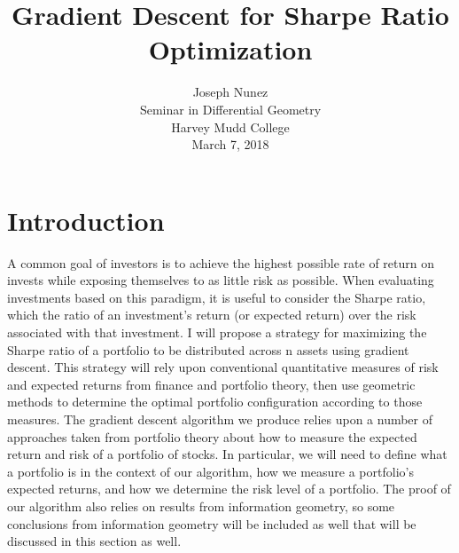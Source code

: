 \documentclass{article}
\title{Gradient Descent for Sharpe Ratio Optimization}
\author{
 Joseph Nunez\\
Seminar in Differential Geometry\\
Harvey Mudd College\\ 
March 7, 2018}
\begin{document}

\maketitle



\section{Introduction}
A common goal of investors is to achieve the highest possible rate of return on invests while exposing themselves to as little risk as possible. When evaluating investments based on this paradigm, it is useful to consider the Sharpe ratio, which the ratio of an investment’s return (or expected return) over the risk associated with that investment. I will propose a strategy for maximizing the Sharpe ratio of a portfolio to be distributed across n assets using gradient descent. This strategy will rely upon conventional quantitative measures of risk and expected returns from finance and portfolio theory, then use geometric methods to determine the optimal portfolio configuration according to those measures.
The gradient descent algorithm we produce relies upon a number of approaches taken from portfolio theory about how to measure the expected return and risk of a portfolio of stocks. In particular, we will need to define what a portfolio is in the context of our algorithm, how we measure a portfolio’s expected returns, and how we determine the risk level of a portfolio. The proof of our algorithm also relies on results from information geometry, so some conclusions from information geometry will be included as well that will be discussed in this section as well.
\end{document}
